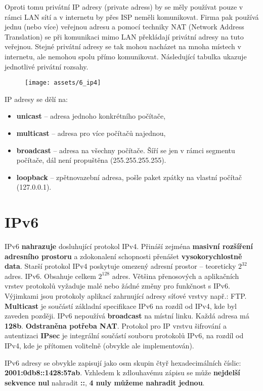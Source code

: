 Oproti tomu privátní IP adresy (private adress) by se měly používat pouze v rámci LAN sítí a v internetu by přes ISP neměli komunikovat. Firma pak používá jednu (nebo více) veřejnou adresu a pomocí techniky NAT (Network Address Translation) se při komunikaci mimo LAN překládají privátní adresy na tuto veřejnou. Stejné privátní adresy se tak mohou nacházet na mnoha místech v internetu, ale nemohou spolu přímo komunikovat. Následující tabulka ukazuje jednotlivé privátní rozsahy.
\begin{figure}[H]
    \centering
    \texttt{[image: assets/6\_ip4]}
\end{figure}

IP adresy se dělí na:
\begin{itemize}
    \item \textbf{unicast} -- adresa jednoho konkrétního počítače,
    \item \textbf{multicast} -- adresa pro více počítačů najednou,
    \item \textbf{broadcast} -- adresa na všechny počítače. Šíří se jen v rámci segmentu počítače, dál není propuštěna (255.255.255.255).
    \item \textbf{loopback} -- zpětnovazební adresa, pošle paket zpátky na vlastní počítač (127.0.0.1).
\end{itemize}

\section{IPv6}
IPv6 \textbf{nahrazuje} dosluhující protokol IPv4. Přináší zejména \textbf{masivní rozšíření adresního prostoru} a zdokonalení schopnosti přenášet \textbf{vysokorychlostně data}. Starší protokol IPv4 poskytuje omezený adresní prostor – teoreticky $2^{32}$ adres. IPv6. Obsahuje celkem $2^{128}$ adres. Většina přenosových a aplikačních vrstev protokolů vyžaduje malé nebo žádné změny pro funkčnost s IPv6. Výjimkami jsou protokoly aplikací zahrnující adresy síťové vrstvy např.: FTP. \textbf{Multicast} je součástí základní specifikace IPv6 na rozdíl od IPv4, kde byl zaveden později. IPv6 nepoužívá \textbf{broadcast} na místní linku. Každá adresa má \textbf{128b}. \textbf{Odstraněna potřeba NAT}. Protokol pro IP vrstvu šifrování a autentizaci \textbf{IPsec} je integrální součástí souboru protokolů IPv6, na rozdíl od IPv4, kde je přítomen volitelně (obvykle ale implementován).

IPv6 adresy se obvykle zapisují jako osm skupin čtyř hexadecimálních číslic: \textbf{2001:0db8::1428:57ab}. Vzhledem k zdlouhavému zápisu se může \textbf{nejdelší sekvence nul} nahradit \textbf{::}, \textbf{4 nuly můžeme nahradit jednou}.

